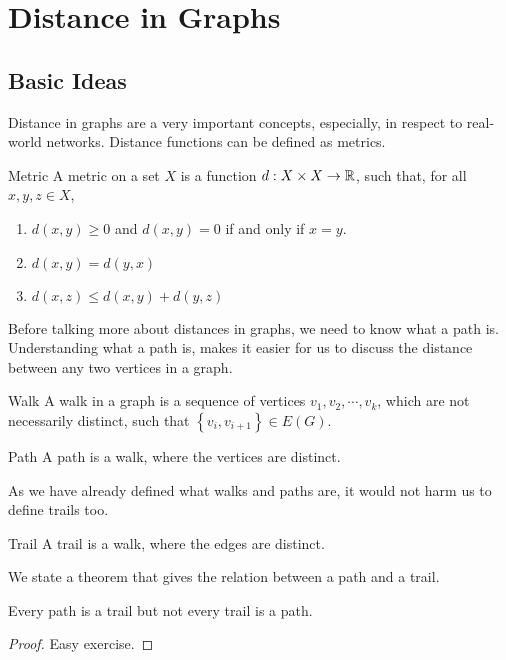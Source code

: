 \documentclass[../basic_graph_theory.tex]{subfiles}
\begin{document}
\chapter{Distance in Graphs}
\setcounter{chapter}{2} %
\setcounter{section}{0}
\setcounter{equation}{0}
\setcounter{figure}{0}

\section{Basic Ideas}
Distance in graphs are a very important concepts, especially, in respect to real-world networks. Distance functions can be defined as metrics.

\begin{Def}{Metric}{}
    A metric on a set $X$ is a function $d:X \times X \rightarrow \mathbb{R}$, such that, for all $x,y,z \in X$,
    \begin{enumerate}
        \item $d(x,y) \ge 0$ and $d(x,y)=0$ if and only if $x=y$.
        \item $d(x,y)=d(y,x)$
        \item $d(x,z) \le d(x,y)+d(y,z)$
    \end{enumerate}
\end{Def}

Before talking more about distances in graphs, we need to know what a path is. Understanding what a path is, makes it easier for us to discuss the distance between any two vertices in a graph.

\begin{Def}{Walk}{}
    A walk in a graph is a sequence of vertices $v_1, v_2,\cdots, v_k$, which are not necessarily distinct, such that $\left\{ v_i, v_{i+1} \right\} \in E(G)$.
\end{Def}

\begin{Def}{Path}{}
    A path is a walk, where the vertices are distinct.
\end{Def}

As we have already defined what walks and paths are, it would not harm us to define trails too.

\begin{Def}{Trail}{}
    A trail is a walk, where the edges are distinct.
\end{Def}

We state a theorem that gives the relation between a path and a trail.

\begin{Thm}{}{}
    Every path is a trail but not every trail is a path.
\end{Thm}
\begin{proof}
    Easy exercise.
\end{proof}
\end{document}
